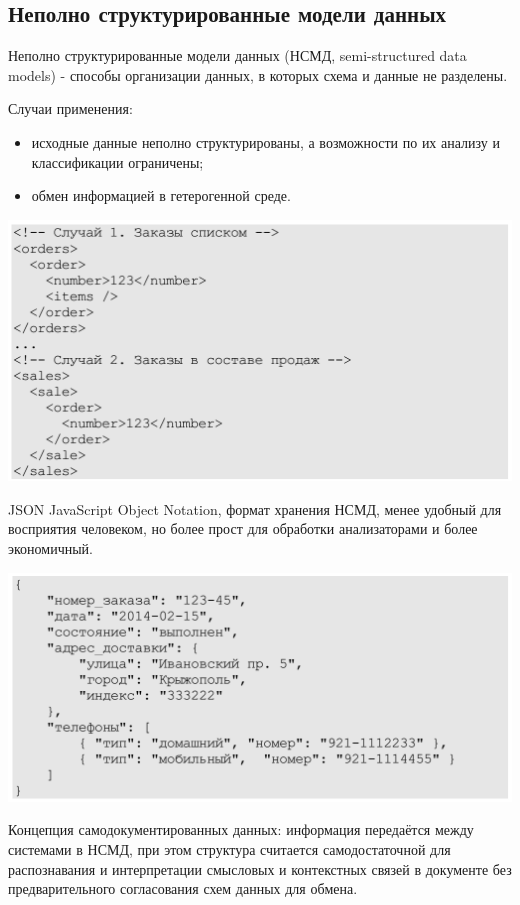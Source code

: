 \documentclass{beamer}
\begin{document}
\subsection{Неполно структурированные модели данных}
\begin{frame} 
\begin{block}{Неполно структурированные модели данных}
(НСМД, semi-structured data models) - способы организации данных, в которых схема и данные не разделены.
\end{block}
Случаи применения:
\begin{itemize}
\item исходные данные неполно структурированы, а возможности по их анализу и классификации ограничены;
\item обмен информацией в гетерогенной среде.
\end{itemize}
\begin{center}
\includegraphics[scale=0.30]{images/xml-01.png}
\end{center}
\end{frame}

\begin{frame}{}
\begin{block}{JSON}
JavaScript Object Notation, формат хранения НСМД, менее удобный для восприятия человеком, но более прост для обработки анализаторами и более экономичный.
\end{block}
\begin{center}
\includegraphics[scale=0.35]{images/json.png}
\end{center}
Концепция самодокументированных данных: информация передаётся между
системами в НСМД, при этом структура считается самодостаточной для распознавания и интерпретации смысловых и контекстных связей в документе без предварительного согласования схем данных для обмена.
\end{frame}
\end{document}
